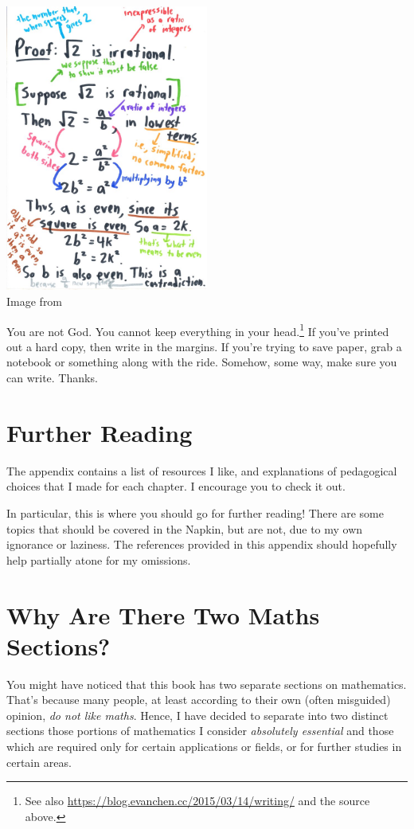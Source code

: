 \begin{center}
  \includegraphics[width=0.5\textwidth]{media/read-with-pencil.jpg}
  \\ \scriptsize Image from~\cite{img:read_with_pencil}
\end{center}
You are not God.
You cannot keep everything in your head.\footnote{See also
	\url{https://blog.evanchen.cc/2015/03/14/writing/} and the source above.}
If you've printed out a hard copy, then write in the margins.
If you're trying to save paper,
grab a notebook or something along with the ride.
Somehow, some way, make sure you can write. Thanks.

\section{Further Reading}
The appendix  contains a list of resources I like,
and explanations of pedagogical choices that I made for each chapter.
I encourage you to check it out.

In particular, this is where you should go for further reading!
There are some topics that should be covered in the Napkin,
but are not, due to my own ignorance or laziness.
The references provided in this appendix should hopefully help partially
atone for my omissions.

\section{Why Are There Two Maths Sections?}
You might have noticed that this book has two separate sections on mathematics.
That's because many people, at least according to their own (often misguided)
opinion, \emph{do not like maths}. Hence, I have decided to separate into two
distinct sections those portions of mathematics I consider \emph{absolutely
  essential} and those which are required only for certain applications or
fields, or for further studies in certain areas.
